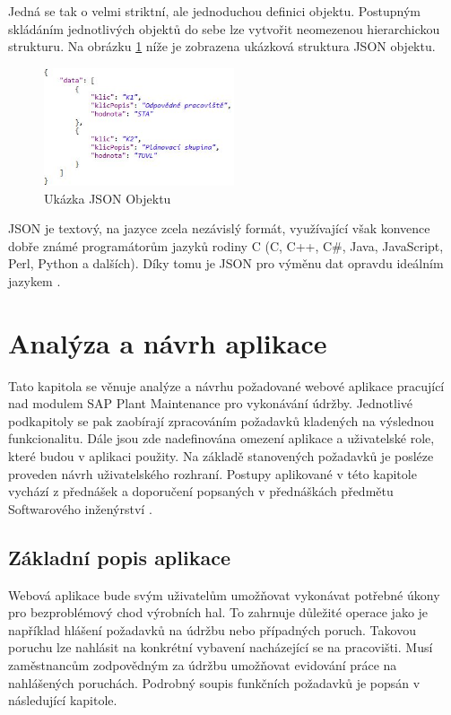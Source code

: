 \documentclass[thesis=M,czech]{FITthesis}[2012/06/26]
\begin{document}
Jedná se tak o velmi striktní, ale jednoduchou definici objektu. Postupným skládáním jednotlivých objektů do sebe lze vytvořit neomezenou hierarchickou strukturu. Na obrázku \ref{img:json} níže je zobrazena ukázková struktura JSON objektu.

\begin{figure}[H]
	\centering
	\includegraphics[width=0.5\textwidth]{images/json}
	\caption{Ukázka JSON Objektu}
	\label{img:json}
\end{figure}

JSON je textový, na jazyce zcela nezávislý formát, využívající však konvence dobře známé programátorům jazyků rodiny C (C, C++, C\#, Java, JavaScript, Perl, Python a dalších). Díky tomu je JSON pro výměnu dat opravdu ideálním jazykem \cite{json}.



\chapter{Analýza a návrh aplikace}
Tato kapitola se věnuje analýze a návrhu požadované webové aplikace pracující nad modulem SAP Plant Maintenance pro vykonávání údržby. Jednotlivé podkapitoly se pak zaobírají zpracováním požadavků kladených na výslednou funkcionalitu. Dále jsou zde nadefinována omezení aplikace a uživatelské role, které budou v aplikaci použity. Na základě stanovených požadavků je posléze proveden návrh uživatelského rozhraní. Postupy aplikované v této kapitole vychází z přednášek a doporučení popsaných v přednáškách předmětu Softwarového inženýrství \cite{edux_si}. 

\section{Základní popis aplikace}
Webová aplikace bude svým uživatelům umožňovat vykonávat potřebné úkony pro bezproblémový chod výrobních hal. To zahrnuje důležité operace jako je například hlášení požadavků na údržbu nebo případných poruch. Takovou poruchu lze nahlásit na konkrétní vybavení nacházející se na pracovišti. Musí zaměstnancům zodpovědným za údržbu umožňovat evidování práce na nahlášených poruchách. Podrobný soupis funkčních požadavků je popsán v následující kapitole. 
\end{document}
